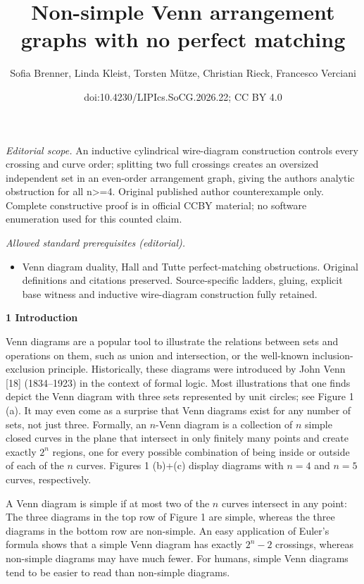 \documentclass[10pt,a4paper]{article}
\title{Non-simple Venn arrangement graphs with no perfect matching}
\author{Sofia Brenner, Linda Kleist, Torsten Mütze, Christian Rieck, Francesco Verciani}
\date{doi:10.4230/LIPIcs.SoCG.2026.22; CC BY 4.0}
\begin{document}
\maketitle
\noindent\textit{Editorial scope.} An inductive cylindrical wire-diagram construction controls every crossing and curve order; splitting two full crossings creates an oversized independent set in an even-order arrangement graph, giving the authors analytic obstruction for all n>=4. Original published author counterexample only. Complete constructive proof is in official CCBY material; no software enumeration used for this counted claim.\par\medskip
\noindent\textit{Allowed standard prerequisites (editorial).}\begin{itemize}
\item Venn diagram duality, Hall and Tutte perfect-matching obstructions. Original definitions and citations preserved. Source-specific ladders, gluing, explicit base witness and inductive wire-diagram construction fully retained.
\end{itemize}\medskip
\par\medskip\noindent\textbf{1 Introduction}\par
Venn diagrams are a popular tool to illustrate the relations between sets and operations on them, such as union and intersection, or the well-known inclusion-exclusion principle. Historically, these diagrams were introduced by John Venn [18] (1834–1923) in the context of formal logic. Most illustrations that one finds depict the Venn diagram with three sets represented by unit circles; see Figure 1 (a). It may even come as a surprise that Venn diagrams exist for any number of sets, not just three. Formally, an $n$-Venn diagram is a collection of $n$ simple closed curves in the plane that intersect in only finitely many points and create exactly $2^{n}$ regions, one for every possible combination of being inside or outside of each of the $n$ curves. Figures 1 (b)+(c) display diagrams with $n=4$ and $n=5$ curves, respectively.
\par
\par
A Venn diagram is simple if at most two of the $n$ curves intersect in any point: The three diagrams in the top row of Figure 1 are simple, whereas the three diagrams in the bottom row are non-simple. An easy application of Euler’s formula shows that a simple Venn diagram has exactly $2^{n}-2$ crossings, whereas non-simple diagrams may have much fewer. For humans, simple Venn diagrams tend to be easier to read than non-simple diagrams.
\end{document}
